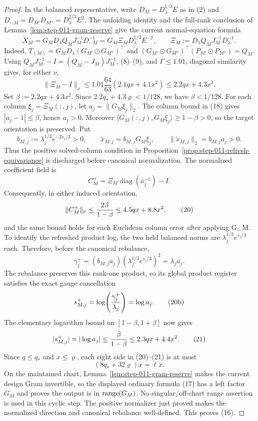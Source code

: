 \begin{proposition}
\begin{proof}
In the balanced representative, write
\(D_M=D_\lambda^{1/3}E\) as in (2) and
\(D_{-M}=D_{M'}D_{M''}=D_\lambda^{2/3}E^2\). The unfolding identity and
the full-rank conclusion of Lemma~\ref{lem:step-011-gram-reserve} give the
current normal-equation formula
\[
 \widetilde X_M
 =G_MD_\lambda Q_MJ_M^{-1}D_{-M}^{-1}
 =G_M\Xi_M D_\lambda^{1/3}E^{-2},
 \qquad
 \Xi_M:=D_\lambda Q_MJ_M^{-1}D_\lambda^{-1}.
\tag{17}
\]
Indeed, \(T_{(M)}=G_MD_\lambda(G_{M'}\odot G_{M''})^\top\) and
\((G_{M'}\odot G_{M''})^\top(P_{M'}\odot P_{M''})=Q_M\).
Using \(Q_MJ_M^{-1}-I=(Q_M-J_M)J_M^{-1}\), (8)--(9), and
\(\Gamma\le1.01\), diagonal similarity gives, for either \(\nu\),
\[
 \|\Xi_M-I\|_\nu
 \le1.01\frac{64}{63}(2.1qx+4.1x^2)
 \le2.2qx+4.3x^2.
\tag{18}
\]
Set \(\beta:=2.2qx+4.3x^2\). Since
\(2.2q_*+4.3\varrho<1/128\), we have \(\beta<1/128\). For each column
\(\xi_j=\Xi_M(:,j)\), let \(a_j=\|G_M\xi_j\|_2\). The column bound in
(18) gives \(|a_j-1|\le\beta\), hence \(a_j>0\). Moreover
\(\langle G_M(:,j),G_M\xi_j\rangle\ge1-\beta>0\), so the target
orientation is preserved. Put
\[
 b_{M,j}:=\lambda_j^{1/3}e^{-2s_j/3}>0,
 \qquad \widetilde x_{M,j}=b_{M,j}G_M\xi_j,
 \qquad \|\widetilde x_{M,j}\|_2=b_{M,j}a_j>0.
\tag{19a}
\]
Thus the positive solved-column condition in
Proposition~\ref{prop:step-011-refresh-equivariance} is discharged before
canonical normalization. The normalized coefficient field is
\[
 C_M^+=\Xi_M\operatorname{diag}(a_j^{-1})-I.
\tag{19}
\]
Consequently, in either induced orientation,
\[
 \|C_M^+\|_\nu
 \le {2\beta\over1-\beta}
 \le4.5qx+8.8x^2,
\tag{20}
\]
and the same bound holds for each Euclidean column error after applying
G\_M. To identify the refreshed product log, the two held balanced norms are
\(\lambda_j^{1/3}e^{s_j/3}\) each. Therefore, before the canonical rebalance,
\[
 \gamma_j^+
 = (b_{M,j}a_j)
   (\lambda_j^{1/3}e^{s_j/3})^2
 = \lambda_j a_j.
\tag{20a}
\]
The rebalance preserves this rank-one product, so its global product register
satisfies the exact gauge cancellation
\[
 s_{M,j}^+
 =\log\!\left({\gamma_j^+\over\lambda_j}\right)=\log a_j.
\tag{20b}
\]
The elementary logarithm bound on \([1-\beta,1+\beta]\) now gives
\[
 |s_{M,j}^+|=|\log a_j|
 \le {\beta\over1-\beta}
 \le2.3qx+4.4x^2.
\tag{21}
\]
Since \(q\le q_*\) and \(x\le\varrho\), each right side in (20)--(21)
is at most
\[
 (8q_*+32\varrho)x=\ell x.
\tag{22}
\]
On the maintained chart, Lemma~\ref{lem:step-011-gram-reserve} makes the
current design Gram invertible, so the displayed ordinary formula (17) has a
left factor \(G_M\) and proves the output is in \({\rm range}(G_M)\). No
singular/off-chart range assertion is used in this cyclic step. The positive
normalizer just proved makes the normalized direction and canonical rebalance
well-defined. This proves (16).


\end{proof}
\end{proposition}
